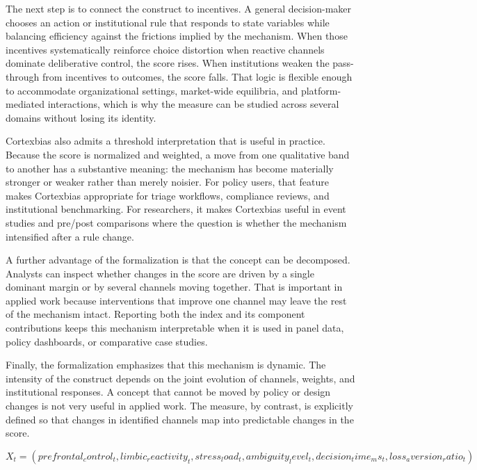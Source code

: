\documentclass[12pt]{article}
\begin{document}
The next step is to connect the construct to incentives. A general decision-maker chooses an action or institutional rule that responds to state variables while balancing efficiency against the frictions implied by the mechanism. When those incentives systematically reinforce choice distortion when reactive channels dominate deliberative control, the score rises. When institutions weaken the pass-through from incentives to outcomes, the score falls. That logic is flexible enough to accommodate organizational settings, market-wide equilibria, and platform-mediated interactions, which is why the measure can be studied across several domains without losing its identity.

Cortexbias also admits a threshold interpretation that is useful in practice. Because the score is normalized and weighted, a move from one qualitative band to another has a substantive meaning: the mechanism has become materially stronger or weaker rather than merely noisier. For policy users, that feature makes Cortexbias appropriate for triage workflows, compliance reviews, and institutional benchmarking. For researchers, it makes Cortexbias useful in event studies and pre/post comparisons where the question is whether the mechanism intensified after a rule change.

A further advantage of the formalization is that the concept can be decomposed. Analysts can inspect whether changes in the score are driven by a single dominant margin or by several channels moving together. That is important in applied work because interventions that improve one channel may leave the rest of the mechanism intact. Reporting both the index and its component contributions keeps this mechanism interpretable when it is used in panel data, policy dashboards, or comparative case studies.

Finally, the formalization emphasizes that this mechanism is dynamic. The intensity of the construct depends on the joint evolution of channels, weights, and institutional responses. A concept that cannot be moved by policy or design changes is not very useful in applied work. The measure, by contrast, is explicitly defined so that changes in identified channels map into predictable changes in the score.

\begin{equation}
X_t = (prefrontal_control_t, limbic_reactivity_t, stress_load_t, ambiguity_level_t, decision_time_ms_t, loss_aversion_ratio_t)
\label{eq:channels}
\end{equation}
\end{document}
